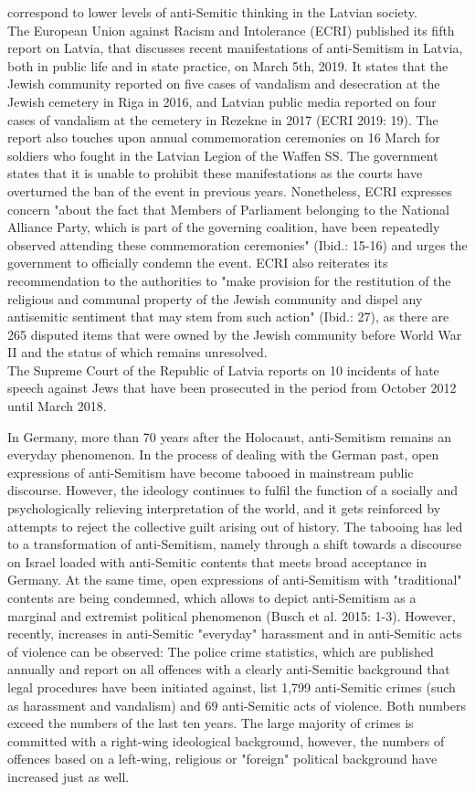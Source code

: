 correspond to lower levels of anti-Semitic thinking in the Latvian society.  \\
The European Union against Racism and Intolerance (ECRI) published its fifth report on Latvia, that discusses recent manifestations of anti-Semitism in Latvia, both in public life and in state practice, on March 5th, 2019. It states that the Jewish community reported on five cases of vandalism and desecration at the Jewish cemetery in Riga in 2016, and Latvian public media reported on four cases of vandalism at the cemetery in Rezekne in 2017 (ECRI 2019: 19). The report also touches upon annual commemoration ceremonies on 16 March for soldiers who fought in the Latvian Legion of the Waffen SS. The government states that it is unable to prohibit these manifestations as the courts have overturned the ban of the event in previous years. Nonetheless, ECRI expresses concern "about the fact that Members of Parliament belonging to the National Alliance Party, which is part of the governing coalition, have been repeatedly observed attending these commemoration ceremonies" (Ibid.: 15-16) and urges the government to officially condemn the event. ECRI also reiterates its recommendation to the authorities to "make provision for the restitution of the religious and communal property of the Jewish community and dispel any antisemitic sentiment that may stem from such action" (Ibid.: 27), as there are 265 disputed items that were owned by the Jewish community before World War II and the status of which remains unresolved. \\
The Supreme Court of the Republic of Latvia reports on 10 incidents of hate speech against Jews that have been prosecuted in the period from October 2012 until March 2018. \par
In Germany, more than 70 years after the Holocaust, anti-Semitism remains an everyday phenomenon. In the process of dealing with the German past, open expressions of anti-Semitism have become tabooed in mainstream public discourse. However, the ideology continues to fulfil the function of a socially and psychologically relieving interpretation of the world, and it gets reinforced by attempts to reject the collective guilt arising out of history. The tabooing has led to a transformation of anti-Semitism, namely through a shift towards a discourse on Israel loaded with anti-Semitic contents that meets broad acceptance in Germany. At the same time, open expressions of anti-Semitism with "traditional" contents are being condemned, which allows to depict anti-Semitism as a marginal and extremist political phenomenon (Busch et al. 2015: 1-3). However, recently, increases in anti-Semitic "everyday" harassment and in anti-Semitic acts of violence can be observed: The police crime statistics, which are published annually and report on all offences with a clearly anti-Semitic background that legal procedures have been initiated against, list 1,799 anti-Semitic crimes (such as harassment and vandalism) and 69 anti-Semitic acts of violence. Both numbers exceed the numbers of the last ten years. The large majority of crimes is committed with a right-wing ideological background, however, the numbers of offences based on a left-wing, religious or "foreign" political background have increased just as well. \\
